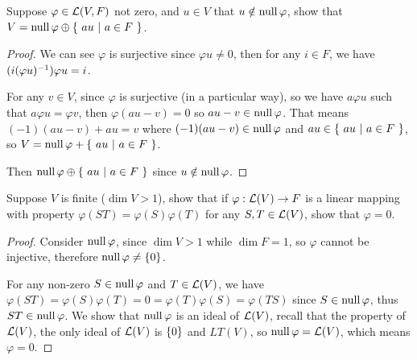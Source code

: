 \documentclass[../main.tex]{subfiles}
\begin{document}
\begin{exercise}
  Suppose $\varphi \in \mathcal{L}(V, F)$ not zero, and $u \in V$ that $u \notin \operatorname{null} \varphi$,
  show that $V = \operatorname{null} \varphi \oplus \{ \ au \ | \ a \in F \ \}$.
\end{exercise}
\begin{proof}
  We can see $\varphi$ is surjective since $\varphi u \neq 0$, then for any $i \in F$,
  we have $(i(\varphi u)^{-1}) \varphi u = i$.

  For any $v \in V$, since $\varphi$ is surjective (in a particular way), so we have $a \varphi u$ such that
  $a \varphi u = \varphi v$, then $\varphi (au - v) = 0$ so $au - v \in \operatorname{null} \varphi$.
  That means $(-1) (au - v) + au = v$ where $(-1) (au - v) \in \operatorname{null} \varphi$ and $au \in \{ \ au \ | \ a \in F \ \}$,
  so $V = \operatorname{null} \varphi + \{ \ au \ | \ a \in F \ \}$.

  Then $\operatorname{null} \varphi \oplus \{ \ au \ | \ a \in F \ \}$ since $u \notin \operatorname{null} \varphi$.
\end{proof}

\begin{exercise}
  Suppose $V$ is finite ($\dim V > 1$), show that if $\varphi : \mathcal{L}(V) \rightarrow F$
  is a linear mapping with property $\varphi(ST) = \varphi(S)\varphi(T)$ for any
  $S, T \in \mathcal{L}(V)$, show that $\varphi = 0$.
\end{exercise}
\begin{proof}
  Consider $\operatorname{null} \varphi$, since $\dim V > 1$ while $\dim F = 1$, so $\varphi$
  cannot be injective, therefore $\operatorname{null} \varphi \neq \{0\}$.

  For any non-zero $S \in \operatorname{null} \varphi$ and $T \in \mathcal{L}(V)$, 
  we have $\varphi(ST) = \varphi(S) \varphi(T) = 0 = \varphi(T) \varphi(S) = \varphi(TS)$
  since $S \in \operatorname{null} \varphi$, thus $ST \in \operatorname{null} \varphi$. We show that
  $\operatorname{null} \varphi$ is an ideal of $\mathcal{L}(V)$, recall that the property of $\mathcal{L}(V)$,
  the only ideal of $\mathcal{L}(V)$ is $\{0\}$ and $LT(V)$, so $\operatorname{null} \varphi = \mathcal{L}(V)$,
  which means $\varphi = 0$.
\end{proof}
\end{document}
